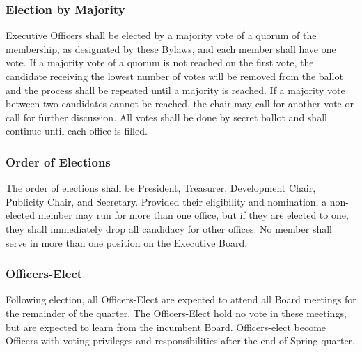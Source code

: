 \documentclass{article}
\begin{document}
\subsubsection{Election by Majority}

Executive Officers shall be elected by a majority vote of a quorum
of the membership, as designated by these Bylaws, and each member
shall have one vote. If a majority vote of a quorum is not reached
on the first vote, the candidate receiving the lowest number of votes
will be removed from the ballot and the process shall be repeated
until a majority is reached. If a majority vote between two candidates
cannot be reached, the chair may call for another vote or call for
further discussion. All votes shall be done by secret ballot and shall
continue until each office is filled.

\subsubsection{Order of Elections}

The order of elections shall be President, Treasurer, Development
Chair, Publicity Chair, and Secretary. Provided their eligibility and nomination,
a non-elected member may run for more than one office, but if they are
elected to one, they shall immediately drop all candidacy for other
offices. No member shall serve in more than one position on the Executive
Board.
\subsubsection{Officers-Elect}
Following election, all Officers-Elect are expected to attend all Board meetings
for the remainder of the quarter. The Officers-Elect hold no vote in these
meetings, but are expected to learn from the incumbent Board. Officers-elect
become Officers with voting privileges and responsibilities after the end of
Spring quarter.

\end{document}
